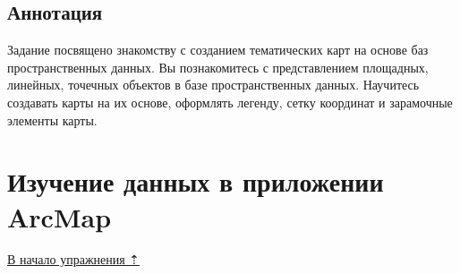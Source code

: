 \documentclass[12pt,]{book}
\begin{document}
\hypertarget{map-design-quaternary-annotation}{%
\subsection{Аннотация}\label{map-design-quaternary-annotation}}

Задание посвящено знакомству с созданием тематических карт на основе баз пространственных данных. Вы познакомитесь с представлением площадных, линейных, точечных объектов в базе пространственных данных. Научитесь создавать карты на их основе, оформлять легенду, сетку координат и зарамочные элементы карты.

\hypertarget{map-design-quaternary-data}{%
\section{Изучение данных в приложении ArcMap}\label{map-design-quaternary-data}}

\protect\hyperlink{map-design-quaternary}{В начало упражнения ⇡}
\end{document}
